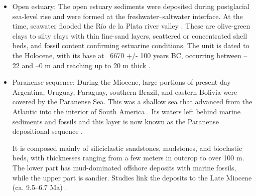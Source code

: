 \begin{itemize}
    \item Open estuary: The open estuary sediments were deposited during postglacial sea-level rise and were formed at the freshwater–saltwater interface. At the time, seawater flooded the Río de la Plata river valley \autocite{cavallottoEvolucionCambiosAmbientales2005}.
    These are olive-green clays to silty clays with thin fine-sand layers, scattered or concentrated shell beds, and fossil content confirming estuarine conditions. The unit is dated to the Holocene, with its base at ~6670 +/- 100 years BC, occurring between –22 and –0 m and reaching up to 20 m thick \autocite{vogelGroningenRadiocarbonDates1969}.
    
    \item Paranense sequence: During the Miocene, large portions of present-day Argentina, Uruguay, Paraguay, southern Brazil, and eastern Bolivia were covered by the Paranense Sea. This was a shallow sea that advanced from the Atlantic into the interior of South America . Its waters left behind marine sediments and fossils and this layer is now known as the Paranense depositional sequence \autocite{tineoReconstructingSouthAmerican2024}.
    
    It is composed mainly of siliciclastic sandstones, mudstones, and bioclastic beds, with thicknesses ranging from a few meters in outcrop to over 100 m. The lower part has mud-dominated offshore deposits with marine fossils, while the upper part is sandier. Studies link the deposits to the Late Miocene (ca. 9.5–6.7 Ma) \autocite{tineoReconstructingSouthAmerican2024}.
\end{itemize}




